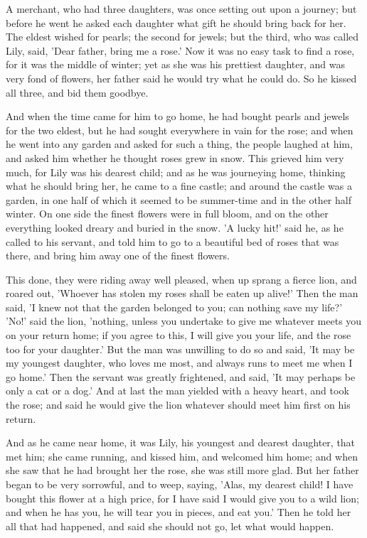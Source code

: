 \documentclass[12pt]{book}
\begin{document}
A merchant, who had three daughters, was once setting out upon a
journey; but before he went he asked each daughter what gift he should
bring back for her. The eldest wished for pearls; the second for
jewels; but the third, who was called Lily, said, 'Dear father, bring
me a rose.' Now it was no easy task to find a rose, for it was the
middle of winter; yet as she was his prettiest daughter, and was very
fond of flowers, her father said he would try what he could do. So he
kissed all three, and bid them goodbye.

And when the time came for him to go home, he had bought pearls and
jewels for the two eldest, but he had sought everywhere in vain for
the rose; and when he went into any garden and asked for such a thing,
the people laughed at him, and asked him whether he thought roses grew
in snow. This grieved him very much, for Lily was his dearest child;
and as he was journeying home, thinking what he should bring her, he
came to a fine castle; and around the castle was a garden, in one half
of which it seemed to be summer-time and in the other half winter. On
one side the finest flowers were in full bloom, and on the other
everything looked dreary and buried in the snow. 'A lucky hit!' said
he, as he called to his servant, and told him to go to a beautiful bed
of roses that was there, and bring him away one of the finest flowers.

This done, they were riding away well pleased, when up sprang a fierce
lion, and roared out, 'Whoever has stolen my roses shall be eaten up
alive!' Then the man said, 'I knew not that the garden belonged to
you; can nothing save my life?' 'No!' said the lion, 'nothing, unless
you undertake to give me whatever meets you on your return home; if
you agree to this, I will give you your life, and the rose too for
your daughter.' But the man was unwilling to do so and said, 'It may
be my youngest daughter, who loves me most, and always runs to meet me
when I go home.' Then the servant was greatly frightened, and said,
'It may perhaps be only a cat or a dog.' And at last the man yielded
with a heavy heart, and took the rose; and said he would give the lion
whatever should meet him first on his return.

And as he came near home, it was Lily, his youngest and dearest
daughter, that met him; she came running, and kissed him, and welcomed
him home; and when she saw that he had brought her the rose, she was
still more glad. But her father began to be very sorrowful, and to
weep, saying, 'Alas, my dearest child! I have bought this flower at a
high price, for I have said I would give you to a wild lion; and when
he has you, he will tear you in pieces, and eat you.' Then he told her
all that had happened, and said she should not go, let what would
happen.
\end{document}
